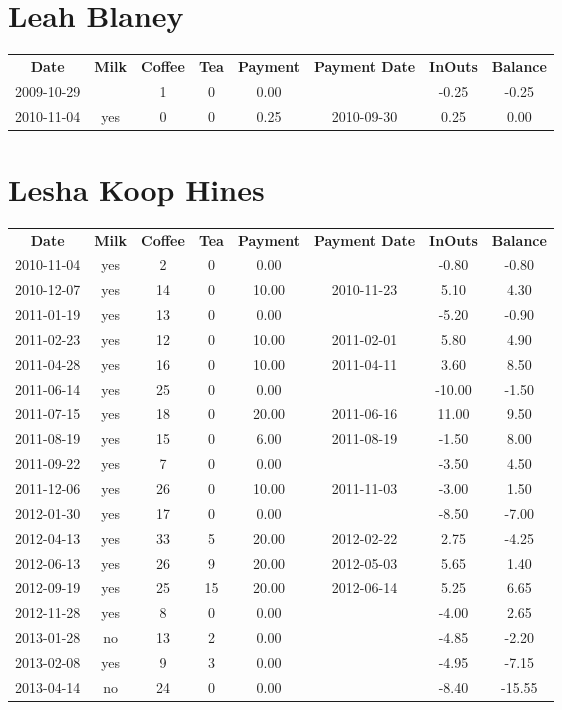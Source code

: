 \section{Leah Blaney}

\begin{center}
\begin{tabular}{cccccccc}
\textbf{Date} & \textbf{Milk} & \textbf{Coffee} & \textbf{Tea} & \textbf{Payment} & \textbf{Payment Date} & \textbf{InOuts} & \textbf{Balance} \\
2009-10-29 &  & 1 & 0 & 0.00 &  & -0.25 & -0.25\\ 
2010-11-04 & yes & 0 & 0 & 0.25 & 2010-09-30 &  0.25 &  0.00
\end{tabular}
\end{center}

\section{Lesha Koop Hines}

\begin{center}
\begin{tabular}{cccccccc}
\textbf{Date} & \textbf{Milk} & \textbf{Coffee} & \textbf{Tea} & \textbf{Payment} & \textbf{Payment Date} & \textbf{InOuts} & \textbf{Balance} \\
2010-11-04 & yes &  2 &  0 &  0.00 &  &  -0.80 &  -0.80\\ 
2010-12-07 & yes & 14 &  0 & 10.00 & 2010-11-23 &   5.10 &   4.30\\ 
2011-01-19 & yes & 13 &  0 &  0.00 &  &  -5.20 &  -0.90\\ 
2011-02-23 & yes & 12 &  0 & 10.00 & 2011-02-01 &   5.80 &   4.90\\ 
2011-04-28 & yes & 16 &  0 & 10.00 & 2011-04-11 &   3.60 &   8.50\\ 
2011-06-14 & yes & 25 &  0 &  0.00 &  & -10.00 &  -1.50\\ 
2011-07-15 & yes & 18 &  0 & 20.00 & 2011-06-16 &  11.00 &   9.50\\ 
2011-08-19 & yes & 15 &  0 &  6.00 & 2011-08-19 &  -1.50 &   8.00\\ 
2011-09-22 & yes &  7 &  0 &  0.00 &  &  -3.50 &   4.50\\ 
2011-12-06 & yes & 26 &  0 & 10.00 & 2011-11-03 &  -3.00 &   1.50\\ 
2012-01-30 & yes & 17 &  0 &  0.00 &  &  -8.50 &  -7.00\\ 
2012-04-13 & yes & 33 &  5 & 20.00 & 2012-02-22 &   2.75 &  -4.25\\ 
2012-06-13 & yes & 26 &  9 & 20.00 & 2012-05-03 &   5.65 &   1.40\\ 
2012-09-19 & yes & 25 & 15 & 20.00 & 2012-06-14 &   5.25 &   6.65\\ 
2012-11-28 & yes &  8 &  0 &  0.00 &  &  -4.00 &   2.65\\ 
2013-01-28 & no & 13 &  2 &  0.00 &  &  -4.85 &  -2.20\\ 
2013-02-08 & yes &  9 &  3 &  0.00 &  &  -4.95 &  -7.15\\ 
2013-04-14 & no & 24 &  0 &  0.00 &  &  -8.40 & -15.55
\end{tabular}
\end{center}

